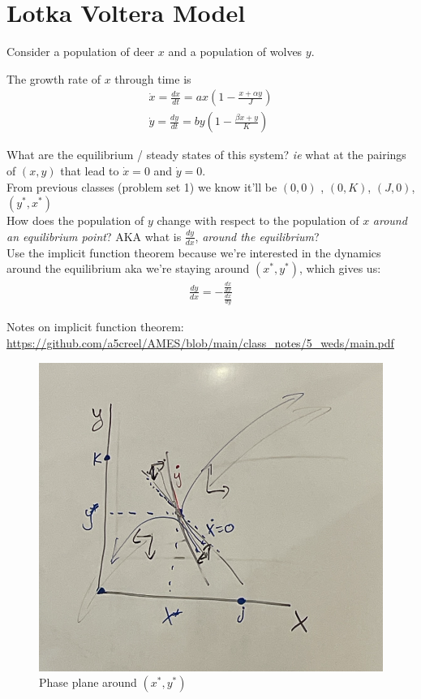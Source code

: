 \documentclass{article}
\begin{document}
\section{Lotka Voltera Model}

Consider a population of deer $x$ and a population of wolves $y$. 

The growth rate of $x$ through time is 
\begin{align*}
     \dot x = \frac{dx}{dt} = ax (1 - \frac{x + \alpha y}{J}) \\
     \dot y = \frac{dy}{dt} = by (1 - \frac{\beta x + y}{K})
\end{align*}


What are the equilibrium / steady states of this system? \textit{ie} what at the pairings of $(x,y)$ that lead to $\dot x = 0$ and $\dot y = 0$. \\

From previous classes (problem set 1) we know it'll be $(0,0)$ , $(0, K)$, $(J, 0)$, $(y^*, x^*)$\\

How does the population of $y$ change with respect to the population of $x$ \textit{around an equilibrium point}? AKA what is $\frac{dy}{dx}$, \textit{around the equilibrium}? \\

Use the implicit function theorem because we're interested in the dynamics around the equilibrium aka  we're staying around $(x^*, y^*)$, which gives us: 
\begin{align}
    \frac{dy}{dx} = - \frac{\frac{d \dot x}{dx}}{\frac{d \dot x}{ d y}}
\end{align}

Notes on implicit function theorem: \url{https://github.com/a5creel/AMES/blob/main/class_notes/5_weds/main.pdf}

\begin{figure}[htp]
    \centering
    \includegraphics[width=0.5\linewidth]{Screen Shot 2023-11-15 at 11.22.55 AM.png}
    \caption{Phase plane around $(x^*, y^*)$}
    \label{fig:enter-label}
\end{figure}
\end{document}
